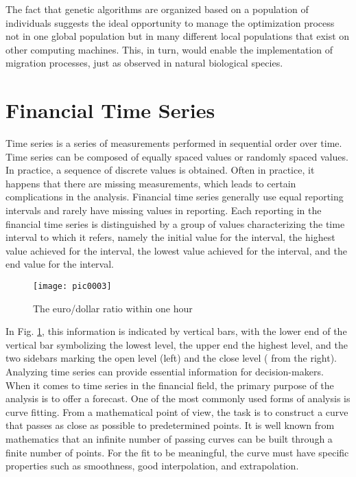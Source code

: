 The fact that genetic algorithms are organized based on a population of individuals suggests the ideal opportunity to manage the optimization process not in one global population but in many different local populations that exist on other computing machines. This, in turn, would enable the implementation of migration processes, just as observed in natural biological species.

\section{Financial Time Series}

Time series is a series of measurements performed in sequential order over time. Time series can be composed of equally spaced values or randomly spaced values. In practice, a sequence of discrete values is obtained. Often in practice, it happens that there are missing measurements, which leads to certain complications in the analysis. Financial time series generally use equal reporting intervals and rarely have missing values in reporting. Each reporting in the financial time series is distinguished by a group of values characterizing the time interval to which it refers, namely the initial value for the interval, the highest value achieved for the interval, the lowest value achieved for the interval, and the end value for the interval.

\begin{figure}[h]
\centering
\texttt{[image: pic0003]}
\caption{The euro/dollar ratio within one hour}
\label{fig:pic0003}
\end{figure}

In Fig. \ref{fig:pic0003}, this information is indicated by vertical bars, with the lower end of the vertical bar symbolizing the lowest level, the upper end the highest level, and the two sidebars marking the open level (left) and the close level ( from the right). Analyzing time series can provide essential information for decision-makers. When it comes to time series in the financial field, the primary purpose of the analysis is to offer a forecast. One of the most commonly used forms of analysis is curve fitting. From a mathematical point of view, the task is to construct a curve that passes as close as possible to predetermined points. It is well known from mathematics that an infinite number of passing curves can be built through a finite number of points. For the fit to be meaningful, the curve must have specific properties such as smoothness, good interpolation, and extrapolation.

